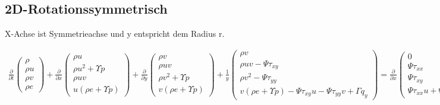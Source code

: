 \subsection{2D-Rotationssymmetrisch}
X-Achse ist Symmetrieachse und y entspricht dem Radius r.

\begin{align*}
\frac{\partial}{\partial t}
\begin{pmatrix}
\rho
\\
\rho u
\\
\rho v
\\
\rho e
\end{pmatrix}
+
\frac{\partial}{\partial x}
\begin{pmatrix}
\rho u
\\
\rho u^2 + \Upsilon p
\\
\rho uv
\\
u\left(\rho e+\Upsilon p\right)
\end{pmatrix}
+
\frac{\partial}{\partial y}
\begin{pmatrix}
\rho v
\\
\rho uv
\\
\rho v^2 + \Upsilon p
\\
v\left(\rho e+\Upsilon p\right)
\end{pmatrix}
+
\frac{1}{y}
\begin{pmatrix}
\rho v
\\
\rho uv - \Psi \tau_{xy}
\\
\rho v^2 - \Psi \tau_{yy}
\\
v\left(\rho e+\Upsilon p\right) - \Psi \tau_{xy} u - \Psi \tau_{yy} v + \Gamma q_y
\end{pmatrix}
=
\frac{\partial}{\partial x}
\begin{pmatrix}
0
\\
\Psi \tau_{xx}
\\
\Psi \tau_{xy}
\\
\Psi \tau_{xx}u+\Psi \tau_{xy}v-\Gamma q_x
\end{pmatrix}
+\frac{\partial}{\partial y}
\begin{pmatrix}
0
\\
\Psi \tau_{yx}
\\
\Psi \tau_{yy}
\\
\Psi \tau_{yx}u+\Psi \tau_{yy}v-\Gamma q_y
\end{pmatrix}
\end{align*}

